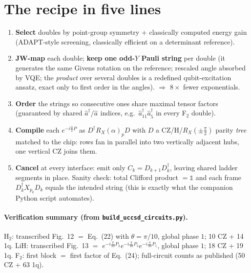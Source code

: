 \documentclass[11pt]{article}
\newcommand{\ad}[1]{\hat{a}^{\dagger}_{#1}}
\newcommand{\an}[1]{\hat{a}_{#1}}
\newcommand{\RX}{R_X}
\begin{document}
\section{The recipe in five lines}
\begin{enumerate}
\item \textbf{Select} doubles by point-group symmetry + classically computed
  energy gain (ADAPT-style screening, classically efficient on a
  determinant reference).
\item \textbf{JW-map} each double; \textbf{keep one odd-$Y$ Pauli string}
  per double (it generates the same Givens rotation on the reference;
  rescaled angle absorbed by VQE; the \emph{product} over several doubles is
  a redefined qubit-excitation ansatz, exact only to first order in the
  angles). $\Rightarrow$ $8\times$ fewer exponentials.
\item \textbf{Order} the strings so consecutive ones share maximal tensor
  factors (guaranteed by shared $\ad{}/\an{}$ indices, e.g.\
  $\ad{11}\ad{5}$ in every F$_2$ double).
\item \textbf{Compile} each $e^{-i\frac{\alpha}{2}P}$ as
  $D^\dagger \RX(\alpha)_p D$ with $D$ a CZ/H/$\RX(\pm\frac{\pi}{2})$
  parity \emph{tree} matched to the chip: rows fan in parallel into two
  vertically adjacent hubs, one vertical CZ joins them.
\item \textbf{Cancel} at every interface: emit only
  $C_k = D_{k+1}D_k^\dagger$, leaving shared ladder segments in place.
  Sanity check: total Clifford product $=\mathbb{1}$ and each frame
  $D_k^\dagger X_{p_k} D_k$ equals the intended string (this is exactly what
  the companion Python script automates).
\end{enumerate}

\paragraph{Verification summary (from \texttt{build\_uccsd\_circuits.py}).}
H$_2$: transcribed Fig.~12 $=$ Eq.~(22) with $\theta=\pi/10$, global phase
$1$; 10 CZ + 14 1q. LiH: transcribed Fig.~13 $=$
$e^{-i\frac{\pi}{10}P_2}e^{-i\frac{\pi}{10}P_3}e^{-i\frac{\pi}{10}P_1}$,
global phase $1$; 18 CZ + 19 1q. F$_2$: first block $=$ first factor of
Eq.~(24); full-circuit counts as published (50 CZ + 63 1q).
\end{document}

